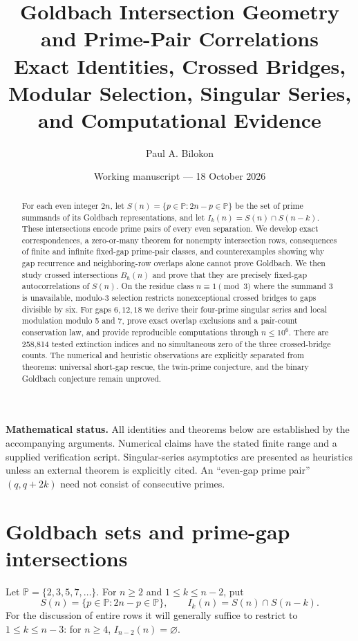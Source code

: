 \documentclass[11pt,a4paper]{article}
\title{\bfseries Goldbach Intersection Geometry and Prime-Pair Correlations\\[4pt]
  \large Exact Identities, Crossed Bridges, Modular Selection,\newline
  Singular Series, and Computational Evidence}
\author{Paul A. Bilokon}
\date{Working manuscript --- 18 October 2026}
\theoremstyle{definition}
\newcommand{\PP}{\mathbb P}
\begin{document}
\maketitle
\begin{abstract}
For each even integer $2n$, let $S(n)=\{p\in\PP:2n-p\in\PP\}$ be the set of prime summands of its Goldbach representations, and let $I_k(n)=S(n)\cap S(n-k)$. These intersections encode prime pairs of every even separation. We develop exact correspondences, a zero-or-many theorem for nonempty intersection rows, consequences of finite and infinite fixed-gap prime-pair classes, and counterexamples showing why gap recurrence and neighboring-row overlaps alone cannot prove Goldbach. We then study crossed intersections $B_h(n)$ and prove that they are precisely fixed-gap autocorrelations of $S(n)$. On the residue class $n\equiv1\pmod3$ where the summand 3 is unavailable, modulo-3 selection restricts nonexceptional crossed bridges to gaps divisible by six. For gaps $6,12,18$ we derive their four-prime singular series and local modulation modulo 5 and 7, prove exact overlap exclusions and a pair-count conservation law, and provide reproducible computations through $n\le10^6$. There are 258,814 tested extinction indices and no simultaneous zero of the three crossed-bridge counts. The numerical and heuristic observations are explicitly separated from theorems: universal short-gap rescue, the twin-prime conjecture, and the binary Goldbach conjecture remain unproved.
\end{abstract}

\noindent\textbf{Mathematical status.} All identities and theorems below are established by the accompanying arguments. Numerical claims have the stated finite range and a supplied verification script. Singular-series asymptotics are presented as heuristics unless an external theorem is explicitly cited. An ``even-gap prime pair'' $(q,q+2k)$ need not consist of consecutive primes.

\tableofcontents

\section{Goldbach sets and prime-gap intersections}
Let $\PP=\{2,3,5,7,\ldots\}$. For $n\ge2$ and $1\le k\le n-2$, put
\begin{equation}\label{eq:S-I}
 S(n)=\{p\in\PP:2n-p\in\PP\},\qquad
 I_k(n)=S(n)\cap S(n-k).
\end{equation}
For the discussion of entire rows it will generally suffice to restrict to $1\le k\le n-3$: for $n\ge4$, $I_{n-2}(n)=\varnothing$.
\end{document}
